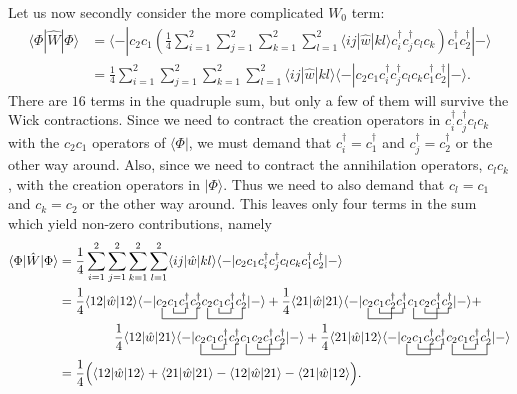 \documentclass[a4paper]{article}
\newcommand{\nn}{\nonumber}
\begin{document}
Let us now secondly consider the more complicated $W_0$ term:
\begin{align}
\langle \Phi | \hat{W} | \Phi \rangle &= \langle-| c_2c_1  \left(\frac{1}{4}\sum_{i=1}^2\sum_{j=1}^2\sum_{k=1}^2\sum_{l=1}^2 \langle i j|\hat{w}| k l \rangle c_i^\dagger c_j^\dagger c_l c_k\right)  c_1^\dagger c_2^\dagger |-\rangle \nn\\
        &= \frac{1}{4}\sum_{i=1}^2\sum_{j=1}^2\sum_{k=1}^2\sum_{l=1}^2 \langle i j|\hat{w}| k l \rangle \langle-| c_2c_1   c_i^\dagger c_j^\dagger c_l c_k  c_1^\dagger c_2^\dagger |-\rangle.
\end{align}
There are $16$ terms in the quadruple sum, but only a few of them will survive the Wick contractions. Since we need to contract the creation operators in $c_i^\dagger c_j^\dagger c_l c_k$ with the $c_2c_1$ operators of $\langle \Phi|$, we must demand that $c_i^\dagger=c_1^\dagger$ and $c_j^\dagger=c_2^\dagger$ or the other way around. Also, since we need to contract the annihilation operators, $c_l c_k$, with the creation operators in $|\Phi\rangle$. Thus we need to also demand that $c_l=c_1$ and $c_k=c_2$ or the other way around. This leaves only four terms in the sum which yield non-zero contributions, namely
\begin{align}
 \langle \Phi | \hat{W} | \Phi \rangle &= \frac{1}{4}\sum_{i=1}^2\sum_{j=1}^2\sum_{k=1}^2\sum_{l=1}^2 \langle i j|\hat{w}| k l \rangle \langle-| c_2c_1   c_i^\dagger c_j^\dagger c_l c_k  c_1^\dagger c_2^\dagger |-\rangle \nn\\
 &= \frac{1}{4}\langle 1 2|\hat{w}| 1 2 \rangle \langle-| \bcontraction[2ex]{}{c_2}{c_1c_1^\dagger}{c_2^\dagger}\bcontraction{c_2}{c_1}{}{c_1^\dagger}\bcontraction[2ex]{c_2c_1c_1^\dagger c_2^\dagger}{c_2}{c_1c_1^\dagger}{c_2^\dagger}\bcontraction{c_2c_1c_1^\dagger c_2^\dagger c_2}{c_1}{}{c_1^\dagger}c_2c_1c_1^\dagger c_2^\dagger c_2 c_1c_1^\dagger c_2^\dagger |-\rangle + \frac{1}{4}\langle 2 1|\hat{w}| 2 1 \rangle \langle-| \bcontraction[2ex]{}{c_2}{c_1}{c_2^\dagger}\bcontraction{c_2}{c_1}{c_2^\dagger}{c_1^\dagger}\bcontraction[2ex]{c_2c_1c_2^\dagger c_1^\dagger}{c_1}{c_2}{c_1^\dagger}\bcontraction{c_2c_1c_2^\dagger c_1^\dagger c_1}{c_2}{c_1^\dagger}{c_2^\dagger}c_2c_1c_2^\dagger c_1^\dagger c_1c_2c_1^\dagger c_2^\dagger |-\rangle + \nn\\
  & \ \ \ \ \ \ \ \ \ \ \ \ \ \frac{1}{4}\langle 1 2|\hat{w}| 2 1 \rangle \langle-| \bcontraction[2ex]{}{c_2}{c_1c_1^\dagger}{c_2}\bcontraction{c_2}{c_1}{}{c_1^\dagger}\bcontraction[2ex]{c_2c_1c_1^\dagger c_2^\dagger}{c_1}{c_2}{c_1^\dagger}\bcontraction{c_2c_1c_1^\dagger c_2^\dagger c_1}{c_2}{c_1^\dagger}{c_2^\dagger}c_2c_1c_1^\dagger c_2^\dagger c_1c_2c_1^\dagger c_2^\dagger |-\rangle + \frac{1}{4}\langle 2 1|\hat{w}| 1 2 \rangle \langle-| \bcontraction[2ex]{}{c_2}{c_1}{c_2^\dagger}\bcontraction{c_2}{c_1}{c_2^\dagger}{c_1^\dagger}\bcontraction[2ex]{c_2c_1c_2^\dagger c_1^\dagger}{c_2}{c_1c_1^\dagger}{c_1^\dagger}\bcontraction{c_2c_1c_2^\dagger c_1^\dagger c_2}{c_1}{}{c_1^\dagger}c_2c_1c_2^\dagger c_1^\dagger c_2c_1c_1^\dagger c_2^\dagger |-\rangle \nn\\
  &= \frac{1}{4}\Big(\langle 1 2|\hat{w}| 1 2 \rangle + \langle 2 1|\hat{w}| 2 1 \rangle - \langle 1 2|\hat{w}| 2 1 \rangle - \langle 2 1|\hat{w}| 1 2 \rangle\Big).
 \end{align} 
\end{document}
